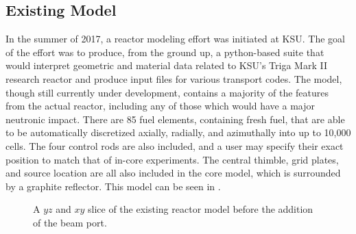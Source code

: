 \subsection{Existing Model}

In the summer of 2017, a reactor modeling effort was initiated at KSU.
The goal of the effort was to produce, from the ground up, a python-based suite that would interpret geometric and material data related to KSU's Triga Mark II research reactor and produce input files for various transport codes.
The model, though still currently under development, contains a majority of the features from the actual reactor, including any of those which would have a major neutronic impact.
There are 85 fuel elements, containing fresh fuel, that are able to be automatically discretized axially, radially, and azimuthally into up to 10,000 cells.
The four control rods are also included, and a user may specify their exact position to match that of in-core experiments.
The central thimble, grid plates, and source location are all also included in the core model, which is surrounded by a graphite reflector.
This model can be seen in .

\begin{figure}
\centering
{} 
\caption[Old Reactor Model]{A $yz$ and $xy$ slice of the existing reactor model before the addition of the beam port.}
\label{fig:existing}
\end{figure}


